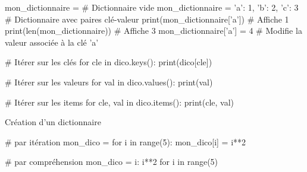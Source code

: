 \def\level{Première}  %
\def\course{NSI}
\def\chaptername{Les dictionnaires} %
\def\docname{AP07-S}        %

\pagestyle{cours_FP}
\makeheader{} %

\begin{definition}{}
	
	\begin{CodePythontexAlt}[TaillePolice=\normalsize, Largeur=1\linewidth,Centre,PremLigne=1, Lignes=false,]{}
mon_dictionnaire = {}				# Dictionnaire vide
mon_dictionnaire = {'a': 1, 'b': 2, 'c': 3}  # Dictionnaire avec paires clé-valeur
print(mon_dictionnaire['a'])  # Affiche 1
print(len(mon_dictionnaire))  # Affiche 3
mon_dictionnaire['a'] = 4  # Modifie la valeur associée à la clé 'a'
		\end{CodePythontexAlt}
\end{definition}

\begin{easybox}{}
\begin{minipage}{0.31\linewidth}
		\begin{CodePythontexAlt}[Largeur=1\linewidth,Centre,Lignes=false,PremLigne=1]{}
	# Itérer sur les clés	
	for cle in dico.keys():
		print(dico[cle])
		\end{CodePythontexAlt}
\end{minipage}\hfill
\begin{minipage}{0.33\linewidth}
		\begin{CodePythontexAlt}[Largeur=1\linewidth,Centre,Lignes=false,PremLigne=1]{}
	# Itérer sur les valeurs
	for val in dico.values():
		print(val)
		\end{CodePythontexAlt}
\end{minipage}\hfill
\begin{minipage}{0.36\linewidth}
		\begin{CodePythontexAlt}[Largeur=1\linewidth,Centre,Lignes=false,PremLigne=1]{}
	# Itérer sur les items
	for cle, val in dico.items():
		print(cle, val)
		\end{CodePythontexAlt}
\end{minipage}
\end{easybox}


\begin{easybox}{Création d'un dictionnaire}{}
	\begin{minipage}[t]{0.5\linewidth}
\begin{CodePythontexAlt}[TaillePolice=\normalsize, Largeur=1\linewidth,Centre,PremLigne=1, Lignes=false,]{}
#  par itération
mon_dico = {}
for i in range(5):
	mon_dico[i] = i**2
\end{CodePythontexAlt}
\end{minipage}\hfill
\begin{minipage}[t]{0.5\linewidth}
\begin{CodePythontexAlt}[TaillePolice=\normalsize, Largeur=1\linewidth,Centre,PremLigne=1, Lignes=false,]{}
#  par compréhension
mon_dico = {i: i**2 for i in range(5)}
\end{CodePythontexAlt}
\end{minipage}
	\end{easybox}

